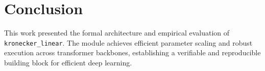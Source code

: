\section{Conclusion}
This work presented the formal architecture and empirical evaluation of \texttt{kronecker_linear}. The module achieves efficient parameter scaling and robust execution across transformer backbones, establishing a verifiable and reproducible building block for efficient deep learning.
